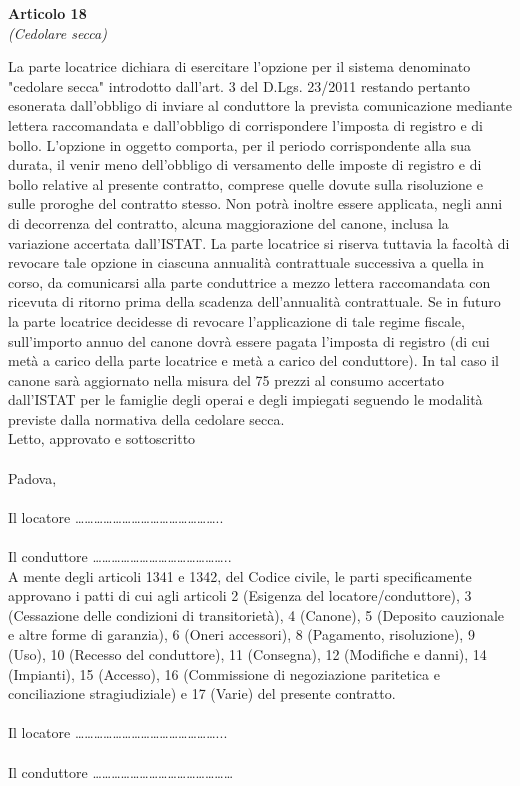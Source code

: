 \documentclass{contratto}
\begin{document}
\begin{center}
\textbf{\Large Articolo 18}\\
\textit{(Cedolare secca)}
\end{center}
La parte locatrice dichiara di esercitare l'opzione per il sistema denominato "cedolare secca"
introdotto dall’art. 3 del D.Lgs. 23/2011 restando pertanto esonerata dall'obbligo di inviare al
conduttore la prevista comunicazione mediante lettera raccomandata e dall'obbligo di
corrispondere l'imposta di registro e di bollo. L’opzione in oggetto comporta, per il periodo
corrispondente alla sua durata, il venir meno dell’obbligo di versamento delle imposte di registro e
di bollo relative al presente contratto, comprese quelle dovute sulla risoluzione e sulle proroghe del
contratto stesso. Non potrà inoltre essere applicata, negli anni di decorrenza del contratto, alcuna
maggiorazione del canone, inclusa la variazione accertata dall’ISTAT. La parte locatrice si riserva
tuttavia la facoltà di revocare tale opzione in ciascuna annualità contrattuale successiva a quella in
corso, da comunicarsi alla parte conduttrice a mezzo lettera raccomandata con ricevuta di ritorno
prima della scadenza dell’annualità contrattuale. Se in futuro la parte locatrice decidesse di
revocare l’applicazione di tale regime fiscale, sull’importo annuo del canone dovrà essere pagata
l’imposta di registro (di cui metà a carico della parte locatrice e metà a carico del conduttore). In tal
caso il canone sarà aggiornato nella misura del 75%
prezzi al consumo accertato dall’ISTAT per le famiglie degli operai e degli impiegati seguendo le
modalità previste dalla normativa della cedolare secca.\\

Letto, approvato e sottoscritto\\\\
Padova, \\\\
Il locatore ………………………………………..\\\\
Il conduttore ……………………………………..\\

A mente degli articoli 1341 e 1342, del Codice civile, le parti specificamente approvano i patti
di cui agli articoli 2 (Esigenza del locatore/conduttore), 3 (Cessazione delle condizioni di
transitorietà), 4 (Canone), 5 (Deposito cauzionale e altre forme di garanzia), 6 (Oneri
accessori), 8 (Pagamento, risoluzione), 9 (Uso), 10 (Recesso del conduttore), 11 (Consegna),
12 (Modifiche e danni), 14 (Impianti), 15 (Accesso), 16 (Commissione di negoziazione
paritetica e conciliazione stragiudiziale) e 17 (Varie) del presente contratto. \\\\
Il locatore ………………………………………...\\\\
Il conduttore ……………………………………… 
\end{document}
